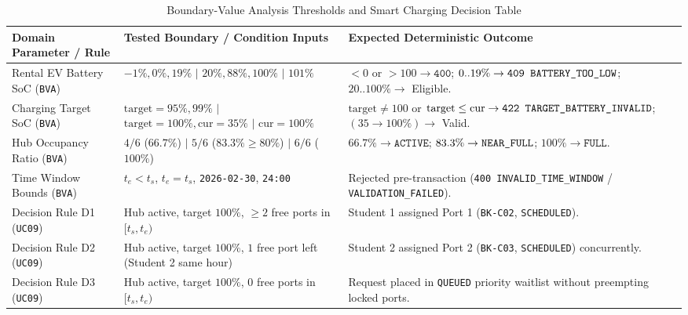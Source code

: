 \begin{table}[H]
  \centering
  \singlespacing\footnotesize
  \caption{Boundary-Value Analysis Thresholds and Smart Charging Decision Table}
  \label{tab:bva-decision}
  \renewcommand{\arraystretch}{1.22}
  \begin{tabularx}{\textwidth}{|L{3.5cm}|L{3.9cm}|Y|}
    \hline
    \textbf{Domain Parameter / Rule} & \textbf{Tested Boundary / Condition Inputs} & \textbf{Expected Deterministic Outcome} \\
    \hline
    Rental EV Battery SoC (\texttt{BVA}) & $-1\%, 0\%, 19\%$ $|$ $20\%, 88\%, 100\%$ $|$ $101\%$ & $<0$ or $>100 \rightarrow \texttt{400}$; $0..19\% \rightarrow \texttt{409 BATTERY\_\allowbreak TOO\_\allowbreak LOW}$; $20..100\% \rightarrow$ Eligible. \\
    \hline
    Charging Target SoC (\texttt{BVA}) & $\text{target}=95\%, 99\%$ $|$ $\text{target}=100\%, \text{cur}=35\%$ $|$ $\text{cur}=100\%$ & $\text{target}\neq 100$ or $\text{target}\le\text{cur} \rightarrow \texttt{422 TARGET\_\allowbreak BATTERY\_\allowbreak INVALID}$; $(35\rightarrow 100\%) \rightarrow$ Valid. \\
    \hline
    Hub Occupancy Ratio (\texttt{BVA}) & $4/6$ ($66.7\%$) $|$ $5/6$ ($83.3\% \ge 80\%$) $|$ $6/6$ ($100\%$) & $66.7\% \rightarrow \texttt{ACTIVE}$; $83.3\% \rightarrow \texttt{NEAR\_\allowbreak FULL}$; $100\% \rightarrow \texttt{FULL}$. \\
    \hline
    Time Window Bounds (\texttt{BVA}) & $t_e < t_s$, $t_e = t_s$, \texttt{2026-02-30}, \texttt{24:00} & Rejected pre-transaction (\texttt{400 INVALID\_\allowbreak TIME\_\allowbreak WINDOW} / \texttt{VALIDATION\_\allowbreak FAILED}). \\
    \hline
    Decision Rule D1 (\texttt{UC09}) & Hub active, target $100\%$, $\ge 2$ free ports in $[t_s,t_e)$ & Student 1 assigned Port 1 (\texttt{BK-C02}, \texttt{SCHEDULED}). \\
    \hline
    Decision Rule D2 (\texttt{UC09}) & Hub active, target $100\%$, $1$ free port left (Student 2 same hour) & Student 2 assigned Port 2 (\texttt{BK-C03}, \texttt{SCHEDULED}) concurrently. \\
    \hline
    Decision Rule D3 (\texttt{UC09}) & Hub active, target $100\%$, $0$ free ports in $[t_s,t_e)$ & Request placed in \texttt{QUEUED} priority waitlist without preempting locked ports. \\
    \hline
  \end{tabularx}
\end{table}


